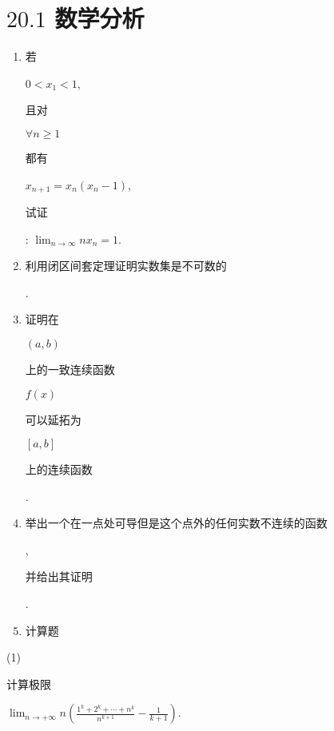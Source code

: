 \documentclass[10pt]{article}
\begin{document}
\section{$20.1$ 数学分析}
\begin{enumerate}
  \item \begin{CJK}{UTF8}{mj}若\end{CJK} $0<x_{1}<1$, \begin{CJK}{UTF8}{mj}且对\end{CJK} $\forall n \geq 1$ \begin{CJK}{UTF8}{mj}都有\end{CJK} $x_{n+1}=x_{n}\left(x_{n}-1\right)$, \begin{CJK}{UTF8}{mj}试证\end{CJK}: $\lim _{n \rightarrow \infty} n x_{n}=1$.

  \item \begin{CJK}{UTF8}{mj}利用闭区间套定理证明实数集是不可数的\end{CJK}.

  \item \begin{CJK}{UTF8}{mj}证明在\end{CJK} $(a, b)$ \begin{CJK}{UTF8}{mj}上的一致连续函数\end{CJK} $f(x)$ \begin{CJK}{UTF8}{mj}可以延拓为\end{CJK} $[a, b]$ \begin{CJK}{UTF8}{mj}上的连续函数\end{CJK}.

  \item \begin{CJK}{UTF8}{mj}举出一个在一点处可导但是这个点外的任何实数不连续的函数\end{CJK}, \begin{CJK}{UTF8}{mj}并给出其证明\end{CJK}.

  \item \begin{CJK}{UTF8}{mj}计算题\end{CJK}

\end{enumerate}
(1) \begin{CJK}{UTF8}{mj}计算极限\end{CJK} $\lim _{n \rightarrow+\infty} n\left(\frac{1^{k}+2^{k}+\cdots+n^{k}}{n^{k+1}}-\frac{1}{k+1}\right)$.
\end{document}
